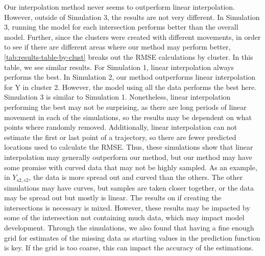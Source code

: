 \documentclass[12pt]{article}
\begin{document}
Our interpolation method never seems to outperform linear interpolation.
However, outside of Simulation 3, the results are not very different. In
Simulation 3, running the model for each intersection performs better
than the overall model. Further, since the clusters were created with
different movements, in order to see if there are different areas where
our method may perform better, \cref{tab:results-table-by-clust} breaks
out the RMSE calculations by cluster. In this table, we see similar
results. For Simulation 1, linear interpolation always performs the
best. In Simulation 2, our method outperforms linear interpolation for Y
in cluster 2. However, the model using all the data performs the best
here. Simulation 3 is similar to Simulation 1. Nonetheless, linear
interpolation performing the best may not be surprising, as there are
long periods of linear movement in each of the simulations, so the
results may be dependent on what points where randomly removed.
Additionally, linear interpolation can not estimate the first or last
point of a trajectory, so there are fewer predicted locations used to
calculate the RMSE. Thus, these simulations show that linear
interpolation may generally outperform our method, but our method may
have some promise with curved data that may not be highly sampled. As an
example, in \(Y_{s2,c2}\), the data is more spread out and curved than
the others. The other simulations may have curves, but samples are taken
closer together, or the data may be spread out but mostly is linear. The
results on if creating the intersections is necessary is mixed. However,
these results may be impacted by some of the intersection not containing
much data, which may impact model development. Through the simulations,
we also found that having a fine enough grid for estimates of the
missing data as starting values in the prediction function is key. If
the grid is too coarse, this can impact the accuracy of the estimations.
\end{document}

